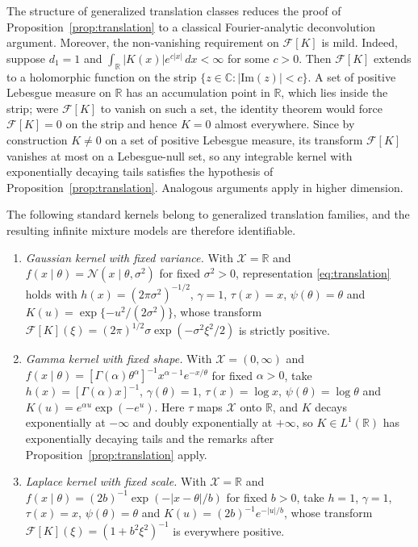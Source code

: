 \documentclass[11pt,twoside]{article} %
\begin{document}
The structure of generalized translation classes reduces the proof of
Proposition~\ref{prop:translation} to a classical Fourier-analytic
deconvolution argument. Moreover, the non-vanishing requirement on $\mathcal F[K]$
is mild. Indeed, suppose $d_1=1$ and $\int_{\mathbb R}|K(x)|e^{c|x|}\,dx<\infty$ for
some $c>0$. Then $\mathcal F[K]$ extends to a holomorphic function on the
strip $\{z\in\mathbb C:|\mathrm{Im}(z)|<c\}$. A set of positive Lebesgue
measure on $\mathbb R$ has an accumulation point in $\mathbb R$, which lies
inside the strip; were $\mathcal F[K]$ to vanish on such a set, the identity
theorem would force $\mathcal F[K]=0$ on the strip and hence $K=0$ almost
everywhere. Since by construction $K\ne0$ on a set of positive Lebesgue measure, its transform $\mathcal F[K]$ vanishes at most on a
Lebesgue-null set, so any integrable kernel with exponentially decaying tails
satisfies the hypothesis of Proposition~\ref{prop:translation}. Analogous
arguments apply in higher dimension.

The following standard kernels belong to generalized translation families, and the resulting infinite mixture models are therefore identifiable. 

\begin{enumerate}
    \item[(i)] \emph{Gaussian kernel with fixed variance.} With $\mathcal X=\mathbb R$ and $f(x\mid\theta)=\mathcal N(x\mid\theta,\sigma^2)$ for fixed $\sigma^2>0$, representation \eqref{eq:translation} holds with $h(x)=(2\pi\sigma^2)^{-1/2}$, $\gamma=1$, $\tau(x)=x$, $\psi(\theta)=\theta$ and $K(u)=\exp\{-u^2/(2\sigma^2)\}$, whose transform $\mathcal F[K](\xi)=(2\pi)^{1/2}\sigma\exp(-\sigma^2\xi^2/2)$ is strictly positive.

    \item[(ii)] \emph{Gamma kernel with fixed shape.} With $\mathcal X=(0,\infty)$
and $f(x\mid\theta)=[\Gamma(\alpha)\theta^{\alpha}]^{-1}x^{\alpha-1}e^{-x/\theta}$
for fixed $\alpha>0$, take $h(x)=[\Gamma(\alpha)x]^{-1}$, $\gamma(\theta)=1$,
$\tau(x)=\log x$, $\psi(\theta)=\log\theta$ and $K(u)=e^{\alpha u}\exp(-e^{u})$.
Here $\tau$ maps $\mathcal X$ onto $\mathbb R$, and $K$ decays exponentially at
$-\infty$ and doubly exponentially at
$+\infty$, so $K\in L^1(\mathbb R)$ has exponentially decaying tails and the
remarks after Proposition~\ref{prop:translation} apply.

    \item[(iii)] \emph{Laplace kernel with fixed scale.} With $\mathcal X=\mathbb R$ and $f(x\mid\theta)=(2b)^{-1}\exp(-|x-\theta|/b)$ for fixed $b>0$, take $h=1$, $\gamma=1$, $\tau(x)=x$, $\psi(\theta)=\theta$ and $K(u)=(2b)^{-1}e^{-|u|/b}$, whose transform $\mathcal F[K](\xi)=(1+b^2\xi^2)^{-1}$ is everywhere positive.
\end{enumerate}
\end{document}
